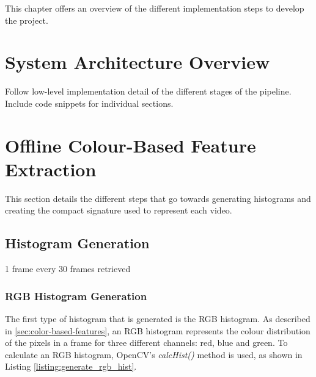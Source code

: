 This chapter offers an overview of the different implementation steps to develop the project.

\section{System Architecture Overview}

Follow low-level implementation detail of the different stages of the pipeline.\\

Include code snippets for individual sections.


\section{Offline Colour-Based Feature Extraction}

This section details the different steps that go towards generating histograms and creating the compact signature used to represent each video.

\subsection{Histogram Generation}

1 frame every 30 frames retrieved

\subsubsection{RGB Histogram Generation}

The first type of histogram that is generated is the RGB histogram. As described in \ref{sec:color-based-features}, an RGB histogram represents the colour distribution of the pixels in a frame for three different channels: red, blue and green. To calculate an RGB histogram, OpenCV's \textit{calcHist()} method is used, as shown in Listing \ref{listing:generate_rgb_hist}. 


